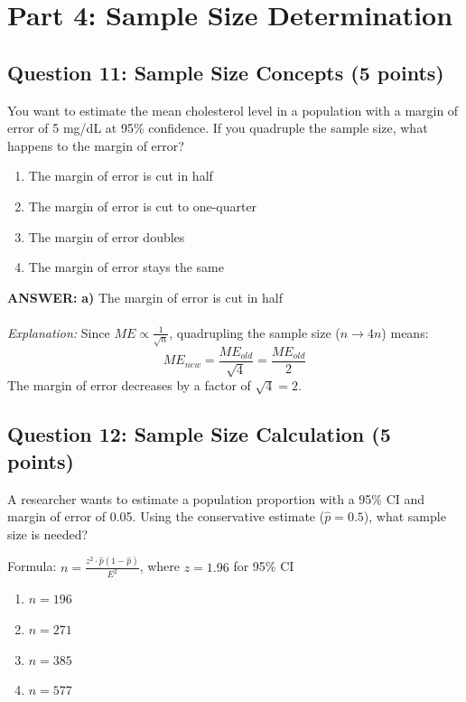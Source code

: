 \documentclass[11pt]{article}
\newcommand{\answer}[1]{\par\vspace{0.3em}\colorbox{green!10}{\parbox{\dimexpr\textwidth-2\fboxsep}{\textbf{ANSWER:} #1}}\vspace{0.3em}\par}
\begin{document}
\section*{Part 4: Sample Size Determination}

\subsection*{Question 11: Sample Size Concepts (5 points)}

You want to estimate the mean cholesterol level in a population with a margin of error of 5 mg/dL at 95\% confidence. If you quadruple the sample size, what happens to the margin of error?

\begin{enumerate}[label=\alph*)]
\item The margin of error is cut in half
\item The margin of error is cut to one-quarter
\item The margin of error doubles
\item The margin of error stays the same
\end{enumerate}

\answer{\textbf{a)} The margin of error is cut in half \\ \\
\textit{Explanation:} Since $ME \propto \frac{1}{\sqrt{n}}$, quadrupling the sample size ($n \to 4n$) means:
$$ME_{new} = \frac{ME_{old}}{\sqrt{4}} = \frac{ME_{old}}{2}$$
The margin of error decreases by a factor of $\sqrt{4} = 2$.}

\subsection*{Question 12: Sample Size Calculation (5 points)}

A researcher wants to estimate a population proportion with a 95\% CI and margin of error of 0.05. Using the conservative estimate ($\hat{p} = 0.5$), what sample size is needed?

Formula: $n = \frac{z^2 \cdot \hat{p}(1-\hat{p})}{E^2}$, where $z = 1.96$ for 95\% CI

\begin{enumerate}[label=\alph*)]
\item $n = 196$
\item $n = 271$
\item $n = 385$
\item $n = 577$
\end{enumerate}
\end{document}
